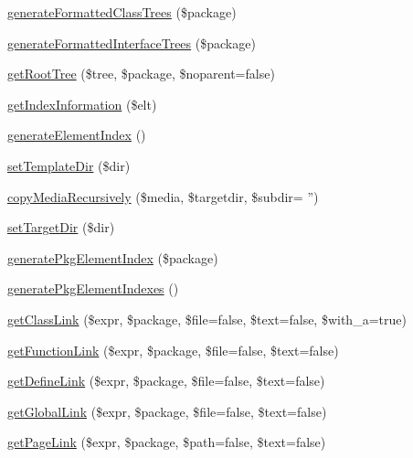 \begin{DoxyCompactItemize}
\item 
\hyperlink{class_c_h_mdefault_converter_ac4ce6d55dd5c5683966b882dcc6809e0}{generate\-Formatted\-Class\-Trees} (\$package)
\item 
\hyperlink{class_c_h_mdefault_converter_a0950322f71c6ac513f10e25f12aefcf0}{generate\-Formatted\-Interface\-Trees} (\$package)
\item 
\hyperlink{class_c_h_mdefault_converter_a28800b40ee0b082b3e6bf82844c2037c}{get\-Root\-Tree} (\$tree, \$package, \$noparent=false)
\item 
\hyperlink{class_c_h_mdefault_converter_afe3edf57e42768ce6a310e1004aef16b}{get\-Index\-Information} (\$elt)
\item 
\hyperlink{class_c_h_mdefault_converter_a2b514cc775614890edad823f189b2655}{generate\-Element\-Index} ()
\item 
\hyperlink{class_c_h_mdefault_converter_a3b18827bcab9cfc5d259cba6fa5ec535}{set\-Template\-Dir} (\$dir)
\item 
\hyperlink{class_c_h_mdefault_converter_ac7d72a781ca48beca5f279582f7e37b1}{copy\-Media\-Recursively} (\$media, \$targetdir, \$subdir= '')
\item 
\hyperlink{class_c_h_mdefault_converter_a07611111094b2954729773f6436a0fe1}{set\-Target\-Dir} (\$dir)
\item 
\hyperlink{class_c_h_mdefault_converter_ad067ad187db8d433a5de042050c63ada}{generate\-Pkg\-Element\-Index} (\$package)
\item 
\hyperlink{class_c_h_mdefault_converter_a147e3da92be9273af6ea18e5a20beeaa}{generate\-Pkg\-Element\-Indexes} ()
\item 
\hyperlink{class_c_h_mdefault_converter_a8b3bb3ebb1cf7b7a31ef71cbe4dcca9e}{get\-Class\-Link} (\$expr, \$package, \$file=false, \$text=false, \$with\-\_\-a=true)
\item 
\hyperlink{class_c_h_mdefault_converter_ab5f43d9a50aae936411c84a680e9c186}{get\-Function\-Link} (\$expr, \$package, \$file=false, \$text=false)
\item 
\hyperlink{class_c_h_mdefault_converter_a17086c17d82323b3e929d24ad6da092d}{get\-Define\-Link} (\$expr, \$package, \$file=false, \$text=false)
\item 
\hyperlink{class_c_h_mdefault_converter_afef6bfb2b26aac19e52a1d153d4bae4b}{get\-Global\-Link} (\$expr, \$package, \$file=false, \$text=false)
\item 
\hyperlink{class_c_h_mdefault_converter_aad8f419498310968275cbd3658e75c90}{get\-Page\-Link} (\$expr, \$package, \$path=false, \$text=false)
\item 

\end{DoxyCompactItemize}
